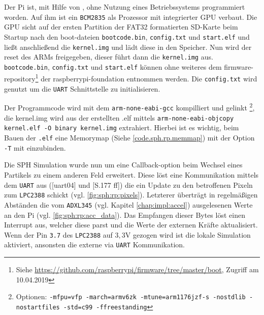 Der Pi ist, mit Hilfe von \cite{rp1.headless.github}, ohne Nutzung eines Betriebssystems programmiert worden. Auf ihm ist ein \texttt{BCM2835} als Prozessor mit integrierter GPU verbaut. Die GPU sicht auf der ersten Partition der FAT32 formatierten SD-Karte beim Startup nach den boot-dateien \texttt{bootcode.bin}, \texttt{config.txt} und \texttt{start.elf} und ließt anschließend die \texttt{kernel.img} und lädt diese in den Speicher. Nun wird der reset des ARMs freigegeben, dieser führt dann die \texttt{kernel.img} aus. \texttt{bootcode.bin}, \texttt{config.txt} und \texttt{start.elf} können ohne weiteres dem firmware-repository\footnote{Siehe \url{https://github.com/raspberrypi/firmware/tree/master/boot}, Zugriff am 10.04.2019} der raspberrypi-foundation entnommen werden. Die \texttt{config.txt} wird genutzt um die \texttt{UART} Schnittstelle zu initialisieren.

Der Programmcode wird mit dem \texttt{arm-none-eabi-gcc} kompilliert und gelinkt \footnote{Optionen: \texttt{-mfpu=vfp -march=armv6zk -mtune=arm1176jzf-s -nostdlib -nostartfiles -std=c99 -ffreestanding}}, die kernel.img wird aus der erstellten .elf mittels \texttt{arm-none-eabi-objcopy kernel.elf -O binary kernel.img} extrahiert. Hierbei ist es wichtig, beim Bauen der \texttt{.elf} eine Memorymap (Siehe \ref{code.sph.rp.memmap}) mit der Option \texttt{-T} mit einzubinden.

Die SPH Simulation wurde nun um eine Callback-option beim Wechsel eines Partikels zu einem anderen Feld erweitert. Diese löst eine Kommunikation mittels dem \texttt{UART} aus (\cite{rp1.headless.github}[uart04] und \cite{broadcom.bcm2835.user_manual}[S.177 ff]) die ein Update zu den betroffenen Pixeln zum \texttt{LPC2388} schickt (vgl. \ref{fig:sph:rp:pixels}). Letzterer überträgt in regelmäßigen Abständen die vom \texttt{ADXL345} (vgl. Kapitel \ref{chap:impl:accel}) ausgelesenen Werte an den Pi (vgl. \ref{fig:sph:rp:acc_data}). Das Empfangen dieser Bytes löst einen Interrupt aus, welcher diese parst und die Werte der externen Kräfte aktualisiert. Wenn der Pin \texttt{3.7} des \texttt{LPC2388} auf $3,3$V gezogen wird ist die lokale Simulation aktiviert, ansonsten die externe via \texttt{UART} Kommunikation.